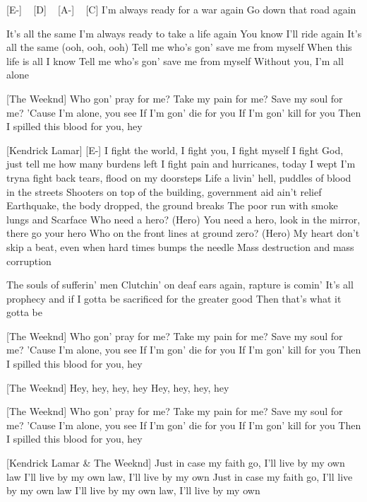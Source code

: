 [E-] ~ [D] ~ [A-] ~ [C]
I'm always ready for a war again
Go down that road again

It's all the same
I'm always ready to take a life again
You know I'll ride again
It's all the same (ooh, ooh, ooh)
Tell me who's gon' save me from myself
When this life is all I know
Tell me who's gon' save me from myself
Without you, I'm all alone

[The Weeknd]
Who gon' pray for me?
Take my pain for me?
Save my soul for me?
'Cause I'm alone, you see
If I'm gon' die for you
If I'm gon' kill for you
Then I spilled this blood for you, hey


[Kendrick Lamar]
[E-]
I fight the world, I fight you, I fight myself
I fight God, just tell me how many burdens left
I fight pain and hurricanes, today I wept
I'm tryna fight back tears, flood on my doorsteps
Life a livin' hell, puddles of blood in the streets
Shooters on top of the building, government aid ain't relief
Earthquake, the body dropped, the ground breaks
The poor run with smoke lungs and Scarface
Who need a hero? (Hero)
You need a hero, look in the mirror, there go your hero
Who on the front lines at ground zero? (Hero)
My heart don't skip a beat, even when hard times bumps the needle
Mass destruction and mass corruption

The souls of sufferin' men
Clutchin' on deaf ears again, rapture is comin'
It's all prophecy and if I gotta be sacrificed for the greater good
Then that's what it gotta be

[The Weeknd]
Who gon' pray for me?
Take my pain for me?
Save my soul for me?
'Cause I'm alone, you see
If I'm gon' die for you
If I'm gon' kill for you
Then I spilled this blood for you, hey

[The Weeknd]
Hey, hey, hey, hey
Hey, hey, hey, hey


[The Weeknd]
Who gon' pray for me?
Take my pain for me?
Save my soul for me?
'Cause I'm alone, you see
If I'm gon' die for you
If I'm gon' kill for you
Then I spilled this blood for you, hey

[Kendrick Lamar & The Weeknd]
Just in case my faith go, I'll live by my own law
I'll live by my own law, I'll live by my own
Just in case my faith go, I'll live by my own law
I'll live by my own law, I'll live by my own

